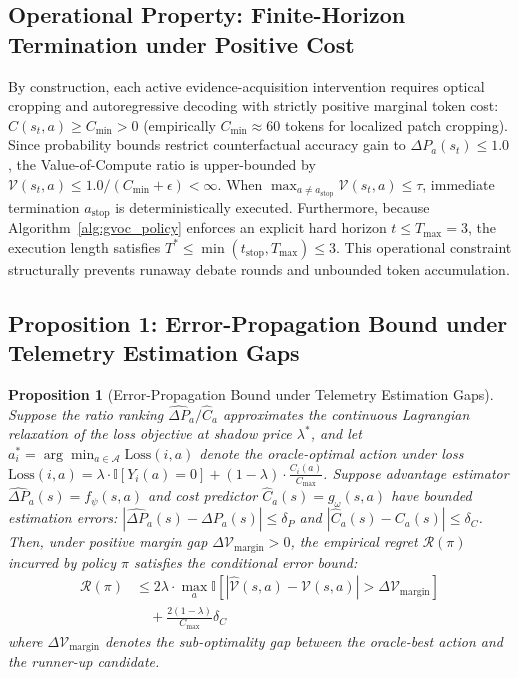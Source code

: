 \documentclass[11pt]{article}
\newtheorem{proposition}[theorem]{Proposition}
\begin{document}
\subsection{Operational Property: Finite-Horizon Termination under Positive Cost}
By construction, each active evidence-acquisition intervention requires optical cropping and autoregressive decoding with strictly positive marginal token cost: $C(s_t, a) \ge C_{\min} > 0$ (empirically $C_{\min} \approx 60$ tokens for localized patch cropping). Since probability bounds restrict counterfactual accuracy gain to $\Delta P_a(s_t) \le 1.0$, the Value-of-Compute ratio is upper-bounded by $\mathcal{V}(s_t, a) \le 1.0 / (C_{\min} + \epsilon) < \infty$. When $\max_{a \neq a_{\text{stop}}} \mathcal{V}(s_t, a) \le \tau$, immediate termination $a_{\text{stop}}$ is deterministically executed. Furthermore, because Algorithm~\ref{alg:gvoc_policy} enforces an explicit hard horizon $t \le T_{\max} = 3$, the execution length satisfies $T^* \le \min(t_{\text{stop}}, T_{\max}) \le 3$. This operational constraint structurally prevents runaway debate rounds and unbounded token accumulation.

\subsection{Proposition 1: Error-Propagation Bound under Telemetry Estimation Gaps}
\label{app:prop1}

\begin{proposition}[Error-Propagation Bound under Telemetry Estimation Gaps]
Suppose the ratio ranking $\hat{\Delta P}_a / \hat{C}_a$ approximates the continuous Lagrangian relaxation of the loss objective at shadow price $\lambda^*$, and let $a^*_i = \arg\min_{a \in \mathcal{A}} \text{Loss}(i, a)$ denote the oracle-optimal action under loss $\text{Loss}(i, a) = \lambda \cdot \mathbb{I}[Y_i(a) = 0] + (1 - \lambda) \cdot \frac{C_i(a)}{C_{\max}}$. Suppose advantage estimator $\hat{\Delta P}_a(s) = f_\psi(s, a)$ and cost predictor $\hat{C}_a(s) = g_\omega(s, a)$ have bounded estimation errors: $|\hat{\Delta P}_a(s) - \Delta P_a(s)| \le \delta_P$ and $|\hat{C}_a(s) - C_a(s)| \le \delta_C$. Then, under positive margin gap $\Delta \mathcal{V}_{\text{margin}} > 0$, the empirical regret $\mathcal{R}(\pi)$ incurred by policy $\pi$ satisfies the conditional error bound:
\begin{equation}
\begin{split}
\mathcal{R}(\pi) &\le 2\lambda \cdot \max_a \mathbb{I}[|\hat{\mathcal{V}}(s, a) - \mathcal{V}(s, a)| > \Delta \mathcal{V}_{\text{margin}}] \\
&\quad + \frac{2(1 - \lambda)}{C_{\max}} \delta_C
\end{split}
\end{equation}
where $\Delta \mathcal{V}_{\text{margin}}$ denotes the sub-optimality gap between the oracle-best action and the runner-up candidate.
\end{proposition}
\end{document}
